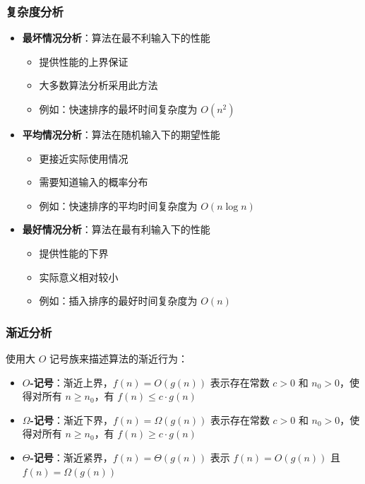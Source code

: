 \documentclass[lang=cn,newtx,10pt,scheme=chinese]{../elegantbook}
\begin{document}
\subsubsection{复杂度分析}
\begin{itemize}
    \item \textbf{最坏情况分析}：算法在最不利输入下的性能
    \begin{itemize}
        \item 提供性能的上界保证
        \item 大多数算法分析采用此方法
        \item 例如：快速排序的最坏时间复杂度为 $O(n^2)$
    \end{itemize}
    
    \item \textbf{平均情况分析}：算法在随机输入下的期望性能
    \begin{itemize}
        \item 更接近实际使用情况
        \item 需要知道输入的概率分布
        \item 例如：快速排序的平均时间复杂度为 $O(n \log n)$
    \end{itemize}
    
    \item \textbf{最好情况分析}：算法在最有利输入下的性能
    \begin{itemize}
        \item 提供性能的下界
        \item 实际意义相对较小
        \item 例如：插入排序的最好时间复杂度为 $O(n)$
    \end{itemize}
\end{itemize}

\subsubsection{渐近分析}
使用大 $O$ 记号族来描述算法的渐近行为：
\begin{itemize}
    \item \textbf{$O$-记号}：渐近上界，$f(n) = O(g(n))$ 表示存在常数 $c > 0$ 和 $n_0 > 0$，使得对所有 $n \geq n_0$，有 $f(n) \leq c \cdot g(n)$
    \item \textbf{$\Omega$-记号}：渐近下界，$f(n) = \Omega(g(n))$ 表示存在常数 $c > 0$ 和 $n_0 > 0$，使得对所有 $n \geq n_0$，有 $f(n) \geq c \cdot g(n)$
    \item \textbf{$\Theta$-记号}：渐近紧界，$f(n) = \Theta(g(n))$ 表示 $f(n) = O(g(n))$ 且 $f(n) = \Omega(g(n))$
\end{itemize}
\end{document}
